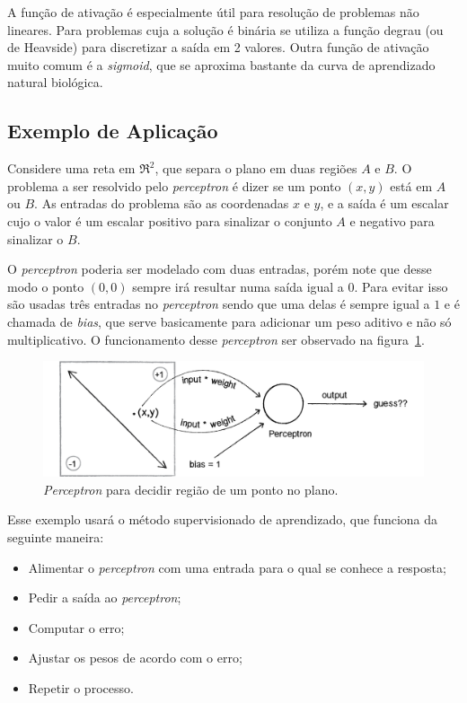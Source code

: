 A função de ativação é especialmente útil para resolução de problemas não
lineares. Para problemas cuja a solução é binária se utiliza a função degrau
(ou de Heavside) para discretizar a saída em 2 valores. Outra função de
ativação muito comum é a \textit{sigmoid}, que se aproxima bastante da curva de
aprendizado natural biológica.

\subsection{Exemplo de Aplicação}

Considere uma reta em $\Re^2$, que separa o plano em duas regiões $A$ e $B$. O problema a
ser resolvido pelo \textit{perceptron} é dizer se um ponto $(x,y)$ está em $A$ ou $B$. As entradas do
problema são as coordenadas $x$ e $y$, e a saída é um escalar cujo o valor é um escalar positivo
para sinalizar o conjunto $A$ e negativo para sinalizar o $B$.

O \textit{perceptron} poderia ser modelado com duas entradas, porém note que desse modo o
ponto $(0,0)$ sempre irá resultar numa saída igual a $0$. Para evitar isso são usadas três entradas
no \textit{perceptron} sendo que uma delas é sempre igual a $1$ e é chamada de \emph{bias}, que serve
basicamente para adicionar um peso aditivo e não só multiplicativo. O funcionamento desse \textit{perceptron}
ser observado na figura~\ref{fig:rede_neural_simple_problem}.

\begin{figure}[ht]
\centering
\includegraphics[width=15cm]{figuras/rede_neural_simple_problem}
\caption{\textit{Perceptron} para decidir região de um ponto no plano.}\label{fig:rede_neural_simple_problem}
\end{figure}

Esse exemplo usará o método supervisionado de aprendizado, que funciona da seguinte maneira:

\begin{itemize}
\item
  Alimentar o \textit{perceptron} com uma entrada para o qual se conhece a resposta;
\item
  Pedir a saída ao \textit{perceptron};
\item
  Computar o erro;
\item
  Ajustar os pesos de acordo com o erro;
\item
  Repetir o processo.
\end{itemize}

